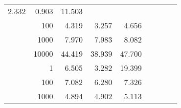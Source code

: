 \begin{table}
\begin{tabular}{rrrrrrrrr}
						
							    
							    
	                           2.332 & 0.903 & 11.503  \\
	                
	            
					 &  
					 
					\multirow{ 1 }{*}{ 100 } &
					
						
							    
							    
	                           4.319 & 3.257 & 4.656  \\
	                
	            
					 &  
					 
					\multirow{ 1 }{*}{ 1000 } &
					
						
							    
							    
	                           7.970 & 7.983 & 8.082  \\
	                
	            
					 &  
					 
					\multirow{ 1 }{*}{ 10000 } &
					
						
							    
							    
	                           44.419 & 38.939 & 47.700  \\
	                
	            
	        
				\noalign{\smallskip}\hline
				\multirow{ 4 }{*}{ 1000000 } &
				
					
					 
					\multirow{ 1 }{*}{ 1 } &
					
						
							    
							    
	                           6.505 & 3.282 & 19.399  \\
	                
	            
					 &  
					 
					\multirow{ 1 }{*}{ 100 } &
					
						
							    
							    
	                           7.082 & 6.280 & 7.326  \\
	                
	            
					 &  
					 
					\multirow{ 1 }{*}{ 1000 } &
					
						
							    
							    
	                           4.894 & 4.902 & 5.113  \\
	                

\end{tabular}
\end{table}
